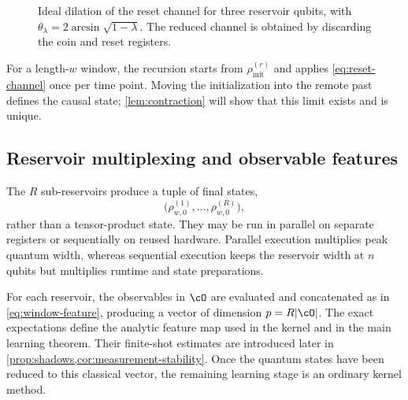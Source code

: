 \begin{figure}[t]
\centering
{}
\caption{Ideal dilation of the reset channel for three reservoir qubits, with
\(\theta_\lambda=2\arcsin\sqrt{1-\lambda}\). The reduced channel is obtained
by discarding the coin and reset registers.}
\label{fig:reset-dilation}
\end{figure}

For a length-\(w\) window, the recursion starts from
\(\rho_{\mathrm{init}}^{(r)}\) and applies \cref{eq:reset-channel} once per time
point. Moving the initialization into the remote past defines the causal state;
\cref{lem:contraction} will show that this limit exists and is unique.

\subsection{Reservoir multiplexing and observable features}

The \(R\) sub-reservoirs produce a tuple of final states,
\[
    \bigl(\rho^{(1)}_{w,0},\ldots,\rho^{(R)}_{w,0}\bigr),
\]
rather than a tensor-product state. They may be run in parallel on separate
registers or sequentially on reused hardware. Parallel execution multiplies
peak quantum width, whereas sequential execution keeps the reservoir width at
\(n\) qubits but multiplies runtime and state preparations.

For each reservoir, the observables in \(\cO\) are evaluated and concatenated
as in \cref{eq:window-feature}, producing a vector of dimension
\(p=R|\cO|\). The exact expectations define the analytic feature map used in
the kernel and in the main learning theorem. Their finite-shot estimates are
introduced later in \cref{prop:shadows,cor:measurement-stability}. Once the
quantum states have been reduced to this classical vector, the remaining
learning stage is an ordinary kernel method.

